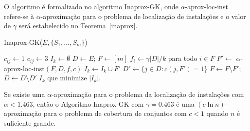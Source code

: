 O algoritmo é formalizado no algoritmo {\sc Inaprox-GK}, onde {\sc $\alpha$-aprox-loc-inst} refere-se à $\alpha$-aproximação para o problema de localização de instalações e o valor de $\gamma$ será estabelecido no Teorema~\ref{inaprox}.

\begin{algorithm}
    \caption{\sc Inaprox-GK($E,\{S_1,\ldots,S_m\}$)}
    \begin{algorithmic}[1]
            \State $c_{ij} \gets 1$
            \Else
            \State $c_{ij} \gets 3$
            \EndIf
            \EndFor
        \EndFor
            \State $I_k \gets \emptyset$
            \State $D \gets E$; $F \gets [m]$
                \State $f_i \gets \gamma |D|/k$ para todo $i \in F$
                \State $F' \gets$ {\sc $\alpha$-aprox-loc-inst}$(F,D,f,c)$
                \State $I_k \gets I_k \cup F'$
                \State $D' \gets \{j \in D: c(j,F') = 1 \}$
                \State $F \gets F \setminus F'$; $D\gets D\setminus D'$
            \EndWhile
        \EndFor
    \State \Return $I_k$ que minimize $|I_k|$.
    \end{algorithmic}
\end{algorithm}


\begin{theorem}
    \label{inaprox}
Se existe uma $\alpha$-aproximação para o problema da localização de instalações com $\alpha < 1.463$, então o  Algoritmo {\sc Inaprox-GK} com $\gamma = 0.463$ é uma $(c \ln n)$-aproximação para o problema de cobertura de conjuntos com $c<1$ quando $n$ é suficiente grande.
\end{theorem}

